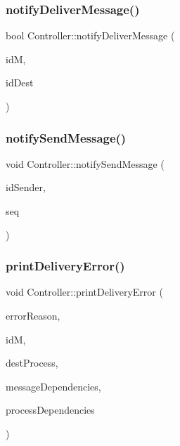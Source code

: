 \subsubsection{\texorpdfstring{notify\+Deliver\+Message()}{notifyDeliverMessage()}}
{\footnotesize\ttfamily bool Controller\+::notify\+Deliver\+Message (\begin{DoxyParamCaption}\item[{\hyperlink{structures_8h_a83a1d9a070efa5341da84cfd8e28d3e5}{id\+Msg}}]{idM,  }\item[{unsigned int}]{id\+Dest }\end{DoxyParamCaption})}

\mbox{\label{class_controller_a7207304a07534e50a690f26c765b4a71}} 
\subsubsection{\texorpdfstring{notify\+Send\+Message()}{notifySendMessage()}}
{\footnotesize\ttfamily void Controller\+::notify\+Send\+Message (\begin{DoxyParamCaption}\item[{unsigned int}]{id\+Sender,  }\item[{unsigned int}]{seq }\end{DoxyParamCaption})}

\mbox{\label{class_controller_ad43f12368786278dd1171226b666395d}} 
\subsubsection{\texorpdfstring{print\+Delivery\+Error()}{printDeliveryError()}}
{\footnotesize\ttfamily void Controller\+::print\+Delivery\+Error (\begin{DoxyParamCaption}\item[{string}]{error\+Reason,  }\item[{\hyperlink{structures_8h_a83a1d9a070efa5341da84cfd8e28d3e5}{id\+Msg}}]{idM,  }\item[{unsigned int}]{dest\+Process,  }\item[{const \hyperlink{class_total_dependencies}{Total\+Dependencies} \&}]{message\+Dependencies,  }\item[{const \hyperlink{class_total_dependencies}{Total\+Dependencies} \&}]{process\+Dependencies }\end{DoxyParamCaption})\hspace{0.3cm}{\ttfamily [private]}}

